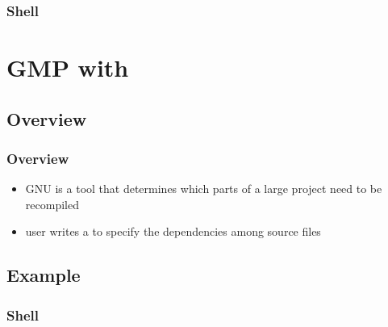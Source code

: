 \begin{frame}
\frametitle{}

\end{frame}

\begin{frame}
\frametitle{Shell}

\end{frame}


\section{GMP with \make}

\subsection{Overview}

\begin{frame}
\frametitle{Overview}
\begin{itemize}
\item GNU \make{} is a tool that determines
  which parts of a large project need to be recompiled
\item user writes a  to specify
  the dependencies among source files
\end{itemize}
\end{frame}

\subsection{Example}

\begin{frame}
\frametitle{}

\end{frame}
\begin{frame}
\frametitle{}

\end{frame}

\begin{frame}
\frametitle{Shell}

\end{frame}
